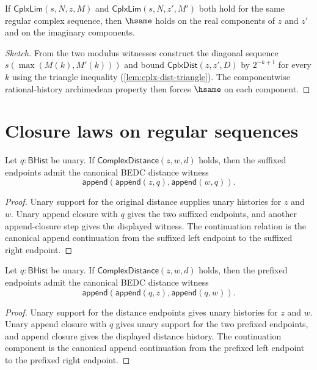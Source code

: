 \begin{theorem}
\label{thm:cplx-lim-unique}
If \(\mathsf{CplxLim}(s, N, z, M)\) and \(\mathsf{CplxLim}(s, N, z', M')\) both hold for the same regular complex sequence, then \(\hsame\) holds on the real components of \(z\) and \(z'\) and on the imaginary components.
\end{theorem}
\begin{proof}[Sketch]
From the two modulus witnesses construct the diagonal sequence \(s(\max(M(k), M'(k)))\) and bound \(\mathsf{CplxDist}(z, z', D)\) by \(2^{-k+1}\) for every \(k\) using the triangle inequality (\autoref{lem:cplx-dist-triangle}). The componentwise rational-history archimedean property then forces \(\hsame\) on each component.
\end{proof}

\section{Closure laws on regular sequences}

\begin{lemma}
\label{lem:complex-distance-append-constant-closed}
Let \(q:\mathsf{BHist}\) be unary. If \(\mathsf{ComplexDistance}(z,w,d)\)
holds, then the suffixed endpoints admit the canonical BEDC distance witness
$$
\mathsf{append}(\mathsf{append}(z,q),\mathsf{append}(w,q)).
$$
\end{lemma}
\begin{proof}
Unary support for the original distance supplies unary histories for \(z\) and
\(w\). Unary append closure with \(q\) gives the two suffixed endpoints, and
another append-closure step gives the displayed witness. The continuation
relation is the canonical append continuation from the suffixed left endpoint
to the suffixed right endpoint.
\end{proof}

\begin{lemma}
\label{lem:complex-distance-prepend-constant-closed}
Let \(q:\mathsf{BHist}\) be unary. If \(\mathsf{ComplexDistance}(z,w,d)\)
holds, then the prefixed endpoints admit the canonical BEDC distance witness
$$
\mathsf{append}(\mathsf{append}(q,z),\mathsf{append}(q,w)).
$$
\end{lemma}
\begin{proof}
Unary support for the distance endpoints gives unary histories for \(z\) and
\(w\). Unary append closure with \(q\) gives unary support for the two prefixed
endpoints, and append closure gives the displayed distance history. The
continuation component is the canonical append continuation from the prefixed
left endpoint to the prefixed right endpoint.
\end{proof}

